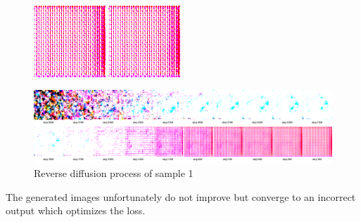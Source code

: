 \documentclass[11pt]{article}
\numberwithin{equation}{section}
\begin{document}
\begin{figure}[h]
	\hfill
	\includegraphics[width=0.24\textwidth]{LatentDiffusion/diffusion-samples/ddpm32/sample_7.png}
	\hfill
	\includegraphics[width=0.24\textwidth]{LatentDiffusion/diffusion-samples/ddpm32/sample_8.png}%
\end{figure}

\begin{figure}[h]
	\caption{Reverse diffusion process of sample 1}
	\label{fig:ddpmcollage}
	\centering
	\includegraphics[width=1\textwidth]{LatentDiffusion/diffusion-samples/collage.png}%
\end{figure}

The generated images unfortunately do not improve but converge to an incorrect output which optimizes the loss.
\end{document}
